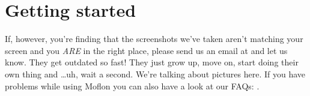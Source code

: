 \section{Getting started}
\genHeader 

If, however, you're finding that the screenshots we've taken aren't matching your screen and you \emph{ARE} in the right place, please send us an email at
\eMoflonContact{} and let us know. They get outdated so fast! They just grow up, move on, start doing their own thing and
\ldots uh, wait a second. We're talking about pictures here.
\newline
If you have problems while using Moflon you can also have a look at our FAQs: .